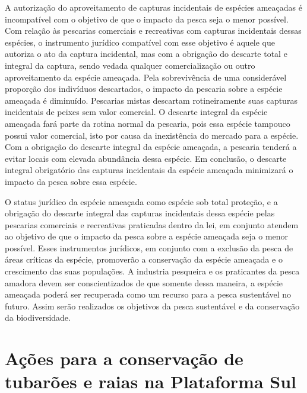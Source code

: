 \documentclass[a4paper,11pt,twoside,showtrims,onecolumn,openright,final]{memoir}
\begin{document}
A autorização do aproveitamento de capturas incidentais de espécies ameaçadas é incompatível com 
o objetivo de que o impacto da pesca seja o menor possível. Com relação às pescarias comerciais e 
recreativas com capturas incidentais dessas espécies, o instrumento jurídico compatível com esse 
objetivo é aquele que autoriza o ato da captura incidental, mas com a obrigação do descarte total 
e integral  da captura, sendo vedada qualquer comercialização ou outro aproveitamento da espécie ameaçada. 
Pela sobrevivência de uma considerável proporção dos indivíduos descartados, o impacto da pescaria sobre 
a espécie ameaçada é diminuído. Pescarias mistas descartam rotineiramente suas capturas incidentais 
de peixes sem valor comercial. O descarte integral da espécie ameaçada fará parte da rotina normal 
da pescaria, pois essa espécie tampouco possui valor comercial, isto por causa da inexistência do mercado 
para a espécie. Com a obrigação do descarte integral da espécie ameaçada, a pescaria tenderá a evitar 
locais com elevada abundância dessa espécie. Em conclusão, o descarte integral obrigatório das capturas 
incidentais da espécie ameaçada minimizará o impacto da pesca sobre essa espécie.

O status jurídico da espécie ameaçada como espécie sob total proteção, e a obrigação do descarte 
integral das capturas incidentais dessa espécie pelas pescarias  comerciais e recreativas praticadas 
dentro da lei, em conjunto atendem ao objetivo de que o impacto da pesca sobre a espécie ameaçada seja 
o menor possível. Esses instrumentos jurídicos, em conjunto com a exclusão da pesca de áreas críticas 
da espécie, promoverão a conservação da espécie ameaçada e o crescimento das suas populações. 
A industria pesqueira e os praticantes da pesca amadora devem ser conscientizados de que somente 
dessa maneira, a espécie ameaçada poderá ser recuperada como um recurso para a pesca sustentável no futuro. 
Assim serão realizados os objetivos da pesca sustentável e da conservação da biodiversidade.


\chapter[Ações para a conservação de tubarões e raias na Plataforma Sul]
        {Ações para a conservação de tubarões e raias na Plataforma Sul}\label{chap:acoes}

\end{document}
